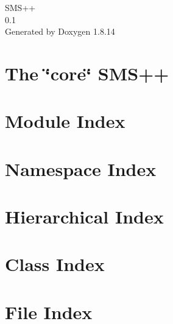 \documentclass[twoside]{book}
\newcommand{\+}{\discretionary{\mbox{\scriptsize$\hookleftarrow$}}{}{}}
\newcommand{\clearemptydoublepage}{%
  \newpage{\pagestyle{empty}\cleardoublepage}%
}
\begin{document}
\hypersetup{pageanchor=false,
             bookmarksnumbered=true,
             pdfencoding=unicode
            }
\begin{titlepage}
\vspace*{7cm}
\begin{center}%
{\Large S\+M\+S++ \\[1ex]\large 0.\+1 }\\
\vspace*{1cm}
{\large Generated by Doxygen 1.8.14}\\
\end{center}
\end{titlepage}
\clearemptydoublepage
{}
\tableofcontents
\clearemptydoublepage
{}
\hypersetup{pageanchor=true}

\chapter{The \char`\"{}core\char`\"{} S\+M\+S++}
\label{index}\hypertarget{index}{}
\chapter{Module Index}

\chapter{Namespace Index}

\chapter{Hierarchical Index}

\chapter{Class Index}

\chapter{File Index}

\end{document}
